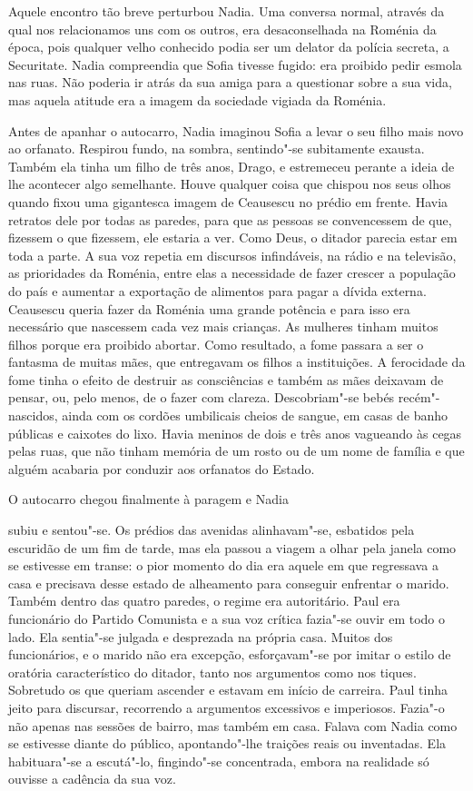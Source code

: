 Aquele encontro tão breve perturbou Nadia. Uma conversa normal,
através da qual nos relacionamos uns com os outros, era desaconselhada
na Roménia da época, pois qualquer velho conhecido podia ser um delator
da polícia secreta, a Securitate. Nadia compreendia que Sofia tivesse
fugido: era proibido pedir esmola nas ruas. Não poderia ir atrás da sua
amiga para a questionar sobre a sua vida, mas aquela atitude era a
imagem da sociedade vigiada da Roménia.

Antes de apanhar o autocarro, Nadia imaginou Sofia a levar o seu filho
mais novo ao orfanato. Respirou fundo, na sombra, sentindo"-se
subitamente exausta. Também ela tinha um filho de três anos, Drago, e
estremeceu perante a ideia de lhe acontecer algo semelhante. Houve
qualquer coisa que chispou nos seus olhos quando fixou uma gigantesca
imagem de Ceausescu no prédio em frente. Havia retratos dele por todas
as paredes, para que as pessoas se convencessem de que, fizessem o que
fizessem, ele estaria
a ver. Como Deus, o ditador parecia estar em toda a parte. A sua voz
repetia em discursos infindáveis, na rádio e na televisão, as
prioridades da Roménia, entre elas a necessidade de fazer crescer a
população do país e aumentar a exportação de alimentos para pagar a
dívida externa. Ceausescu queria fazer da Roménia uma grande potência e
para isso era necessário que nascessem cada vez mais crianças. As
mulheres tinham muitos filhos porque era proibido abortar. Como
resultado, a fome passara a ser o fantasma de muitas mães, que
entregavam os filhos a instituições. A ferocidade da fome tinha o
efeito de destruir as consciências e também as mães deixavam de pensar,
ou, pelo menos, de o fazer com clareza. Descobriam"-se bebés
recém"-nascidos, ainda com os cordões umbilicais cheios de sangue, em
casas de banho públicas e caixotes do lixo. Havia meninos de dois e três
anos vagueando às cegas pelas ruas, que não tinham memória de um rosto
ou de um nome de família e que alguém acabaria por conduzir aos
orfanatos do Estado.

O autocarro chegou finalmente à paragem e Nadia

subiu e sentou"-se. Os prédios das avenidas alinhavam"-se, esbatidos pela
escuridão de um fim de tarde, mas ela passou a viagem a olhar pela
janela como se estivesse em transe: o pior momento do dia era aquele em
que regressava a casa e precisava desse estado de alheamento para
conseguir enfrentar o marido. Também dentro das quatro paredes, o regime
era autoritário. Paul era funcionário do Partido Comunista e a sua voz
crítica fazia"-se ouvir em todo o lado. Ela sentia"-se julgada e
desprezada na própria casa. Muitos dos funcionários, e o marido não era
excepção,
esforçavam"-se por imitar o estilo de oratória característico do ditador,
tanto nos argumentos como nos tiques. Sobretudo os que queriam
ascender e estavam em início de carreira. Paul tinha jeito para
discursar, recorrendo a argumentos excessivos e imperiosos. Fazia"-o não
apenas nas sessões de bairro, mas também em casa. Falava com Nadia como
se estivesse diante do público, apontando"-lhe traições reais ou
inventadas. Ela habituara"-se a escutá"-lo, fingindo"-se concentrada,
embora na realidade só ouvisse a cadência da sua voz.

